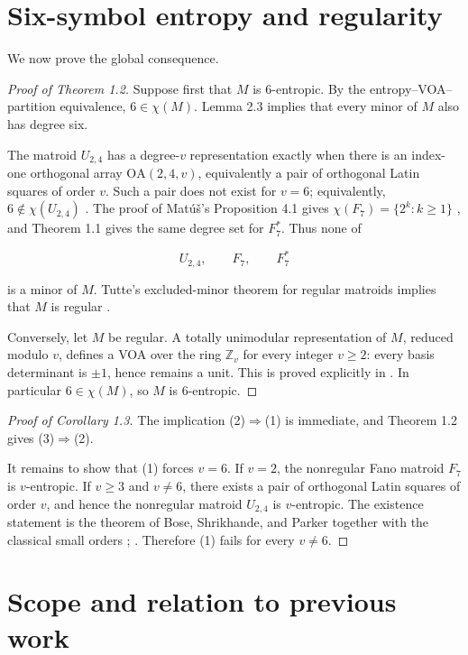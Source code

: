 \documentclass[11pt]{article}
\numberwithin{equation}{section}
\begin{document}
\section{Six-symbol entropy and regularity}


\Needspace{0.26\textheight}
We now prove the global consequence.

\begin{proof}[Proof of Theorem 1.2]
Suppose first that $M$ is 6-entropic. By the
entropy--VOA--partition equivalence, $6\in\chi(M)$. Lemma 2.3 implies that
every minor of $M$ also has degree six.

The matroid $U_{2,4}$ has a degree-$v$ representation exactly when there
is an index-one orthogonal array $\mathrm{OA}(2,4,v)$, equivalently a
pair of orthogonal Latin squares of order $v$. Such a pair does not exist
for $v=6$; equivalently, $6\notin\chi(U_{2,4})$ \cite[Example 4]{chen2025}. The proof
of Mat\'u\v{s}'s Proposition 4.1 gives $\chi(F_7)=\{2^k:k\ge1\}$ \cite{matus1999}, and
Theorem 1.1 gives
the same degree set for $F_7^*$. Thus none of

\nopagebreak[4]
\[
U_{2,4},\qquad F_7,\qquad F_7^*
\]

is a minor of $M$. Tutte's excluded-minor theorem for regular matroids
implies that $M$ is regular \cite[Theorem 6.6.6]{oxley2011}.

Conversely, let $M$ be regular. A totally unimodular representation of
$M$, reduced modulo $v$, defines a VOA over the ring $\mathbb Z_v$ for
every integer $v\ge2$: every basis determinant is $\pm1$, hence remains
a unit. This is proved explicitly in \cite[Lemma 3 and Proposition 7]{chen2025}. In
particular $6\in\chi(M)$, so $M$ is 6-entropic.
\end{proof}


\begin{proof}[Proof of Corollary 1.3]
The implication (2)$\Rightarrow$(1) is immediate,
and Theorem 1.2 gives (3)$\Rightarrow$(2).

It remains to show that (1) forces $v=6$. If $v=2$, the nonregular Fano
matroid $F_7$ is $v$-entropic. If $v\ge3$ and $v\ne6$, there exists a
pair of orthogonal Latin squares of order $v$, and hence the nonregular
matroid $U_{2,4}$ is $v$-entropic. The existence statement is the theorem
of Bose, Shrikhande, and Parker together with the classical small orders
\cite[Example 4]{chen2025}; \cite{bose1960}. Therefore (1) fails for every $v\ne6$.
\end{proof}


\section{Scope and relation to previous work}
\end{document}
